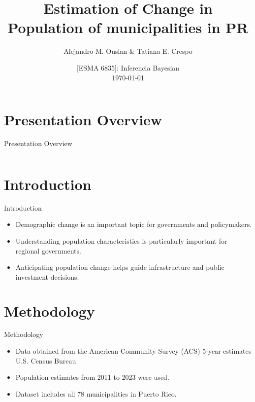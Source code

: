 \documentclass[11pt]{beamer}
\title{Estimation of Change in \\ Population of municipalities in PR}
\author[Ouslan]{\small{
Alejandro M. Ouslan \& Tatiana E. Crespo}}
\institute[UPRM]{University of Puerto Rico, Mayagüez}
\date[\today]{\small{[ESMA 6835]: Inferencia Bayesian}\\
\vspace{2mm}
\footnotesize{\today}}
\begin{document}
{
\begin{frame}
	\titlepage
\end{frame}
}


\section*{Presentation Overview}
\begin{frame}{Presentation Overview}

	\begin{columns}[T,onlytextwidth]
		\tableofcontents[sections={1-3}]

		\tableofcontents[sections={4-6}]
	\end{columns}

\end{frame}

\section{Introduction}

\begin{frame}{Introduction}

	\begin{itemize}
		\item Demographic change is an important topic for governments and policymakers.
		\item Understanding population characteristics is particularly important for regional governments.
		\item Anticipating population change helps guide infrastructure and public investment decisions.
	\end{itemize}

\end{frame}

\section{Methodology}

\begin{frame}{Methodology}

	\begin{itemize}
		\item Data obtained from the American Community Survey (ACS) 5-year estimates U.S. Census Bureau
		\item Population estimates from 2011 to 2023 were used.
		\item Dataset includes all 78 municipalities in Puerto Rico.
	\end{itemize}

\end{frame}
\end{document}
